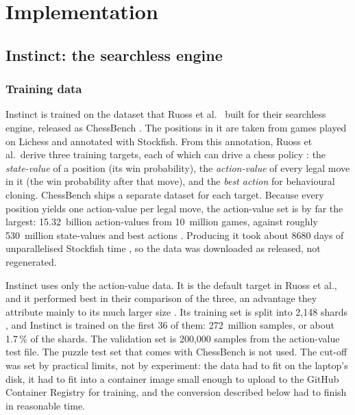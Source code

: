 \chapter{Implementation}
\label{chap:implementation}

\section{Instinct: the searchless engine}
\label{sec:instinct}

\subsection{Training data}
\label{subsec:training-data}
Instinct is trained on the dataset that Ruoss et al.~\cite{Ruoss2024} built for their searchless engine, released as ChessBench \cite{GoogleDeepMind2024}.
The positions in it are taken from games played on Lichess and annotated with Stockfish.
From this annotation, Ruoss et al.\ derive three training targets, each of which can drive a chess policy \cite{Ruoss2024}: the \emph{state-value} of a position (its win probability), the \emph{action-value} of every legal move in it (the win probability after that move), and the \emph{best action} for behavioural cloning.
ChessBench ships a separate dataset for each target.
Because every position yields one action-value per legal move, the action-value set is by far the largest: 15.32~billion action-values from 10~million games, against roughly 530~million state-values and best actions \cite{Ruoss2024}.
Producing it took about 8680 days of unparallelised Stockfish time \cite{Ruoss2024}, so the data was downloaded as released, not regenerated.

Instinct uses only the action-value data.
It is the default target in Ruoss et al., and it performed best in their comparison of the three, an advantage they attribute mainly to its much larger size \cite{Ruoss2024}.
Its training set is split into 2,148 shards \cite{GoogleDeepMind2024}, and Instinct is trained on the first 36 of them: 272~million samples, or about 1.7\,\% of the shards.
The validation set is 200,000 samples from the action-value test file.
The puzzle test set that comes with ChessBench is not used.
The cut-off was set by practical limits, not by experiment: the data had to fit on the laptop's disk, it had to fit into a container image small enough to upload to the GitHub Container Registry for training, and the conversion described below had to finish in reasonable time.

